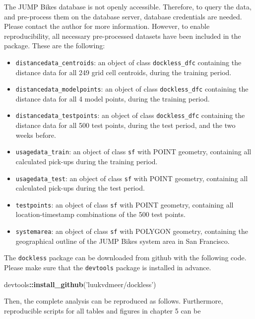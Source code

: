 \documentclass[12pt,oneside]{reedthesis}
\newenvironment{Shaded}{\begin{snugshade}}{\end{snugshade}}
\newcommand{\KeywordTok}[1]{\textcolor[rgb]{0.13,0.29,0.53}{\textbf{#1}}}
\newcommand{\StringTok}[1]{\textcolor[rgb]{0.31,0.60,0.02}{#1}}
\newcommand{\OperatorTok}[1]{\textcolor[rgb]{0.81,0.36,0.00}{\textbf{#1}}}
\newcommand{\NormalTok}[1]{#1}
\providecommand{\tightlist}{%
  \setlength{\itemsep}{0pt}\setlength{\parskip}{0pt}}
\begin{document}
The JUMP Bikes database is not openly accessible. Therefore, to query
the data, and pre-process them on the database server, database
credentials are needed. Please contact the author for more information.
However, to enable reproducibility, all necessary pre-processed datasets
have been included in the package. These are the following:
\begin{itemize}
\tightlist
\item
  \texttt{distancedata\_centroids}: an object of class
  \texttt{dockless\_dfc} containing the distance data for all 249 grid
  cell centroids, during the training period.
\item
  \texttt{distancedata\_modelpoints}: an object of class
  \texttt{dockless\_dfc} containing the distance data for all 4 model
  points, during the training period.
\item
  \texttt{distancedata\_testpoints}: an object of class
  \texttt{dockless\_dfc} containing the distance data for all 500 test
  points, during the test period, and the two weeks before.
\item
  \texttt{usagedata\_train}: an object of class \texttt{sf} with POINT
  geometry, containing all calculated pick-ups during the training
  period.
\item
  \texttt{usagedata\_test}: an object of class \texttt{sf} with POINT
  geometry, containing all calculated pick-ups during the test period.
\item
  \texttt{testpoints}: an object of class \texttt{sf} with POINT
  geometry, containing all location-timestamp combinations of the 500
  test points.
\item
  \texttt{systemarea}: an object of class \texttt{sf} with POLYGON
  geometry, containing the geographical outline of the JUMP Bikes system
  area in San Francisco.
\end{itemize}
The \texttt{dockless} package can be downloaded from github with the
following code. Please make sure that the \texttt{devtools} package is
installed in advance.\\
\begin{Shaded}
\begin{Highlighting}[]
\NormalTok{devtools}\OperatorTok{::}\KeywordTok{install_github}\NormalTok{(}\StringTok{'luukvdmeer/dockless'}\NormalTok{)}
\end{Highlighting}
\end{Shaded}
Then, the complete analysis can be reproduced as follows. Furthermore,
reproducible scripts for all tables and figures in chapter 5 can be
\end{document}
